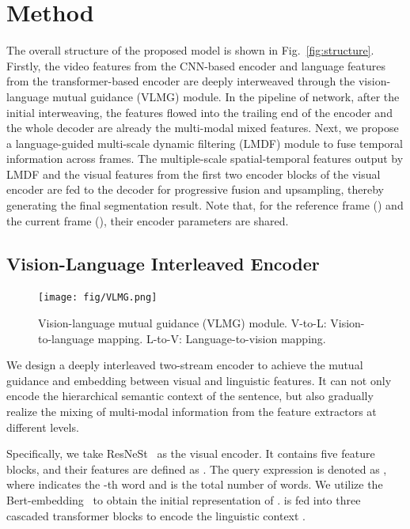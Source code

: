 \documentclass[10pt,twocolumn,letterpaper]{article}
\begin{document}
\section{Method}
The overall structure of the proposed model is shown in Fig.~\ref{fig:structure}. Firstly, the video features from the CNN-based encoder and language features from the transformer-based encoder are deeply interweaved  through the vision-language mutual guidance (VLMG) module. In the pipeline of network, after the initial interweaving, the features flowed into the trailing end of the encoder and the whole decoder are already the multi-modal mixed features.  Next, we propose a language-guided multi-scale dynamic filtering (LMDF) module to fuse temporal information across frames. The multiple-scale spatial-temporal features output by LMDF and the visual features from the first two encoder blocks of the visual encoder are fed to the decoder for progressive fusion and upsampling, thereby generating the final segmentation result. Note that, for the reference frame () and the current frame (), their encoder parameters are shared.
\subsection{Vision-Language Interleaved Encoder}
\begin{figure}[t]
\vspace{0mm}
\texttt{[image: fig/VLMG.png]}
\ \\
{\begin{center}
\vspace{-13mm}
\caption{\small{Vision-language mutual guidance (VLMG) module. V-to-L: Vision-to-language mapping. L-to-V: Language-to-vision mapping.
}}
\label{fig:VLMG}
\end{center}
}
\vspace{-2mm}
\end{figure}
We design a deeply interleaved two-stream encoder to achieve the mutual guidance and embedding between visual and linguistic features. It can not only encode the hierarchical semantic context of the sentence, but also gradually realize the mixing of multi-modal information from the feature extractors at different levels.


Specifically, we take ResNeSt~\cite{zhang2020resnest} as the visual encoder. It contains five feature blocks, and their features are defined as . The query expression is denoted as , where  indicates the -th word and  is the total number of words. We utilize the Bert-embedding~\cite{devlin2018bert} to obtain the initial representation  of .  is fed into three cascaded transformer blocks to encode the linguistic context .
\end{document}
